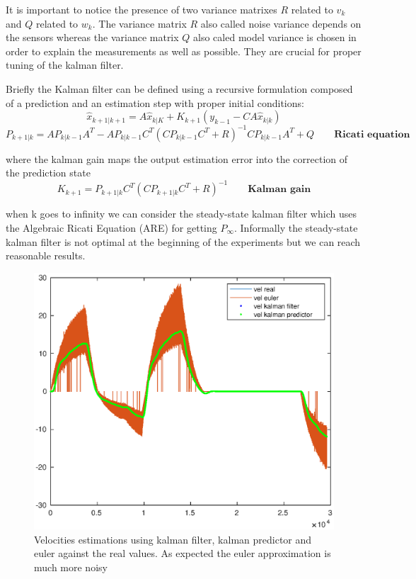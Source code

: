 \documentclass[a4paper,12pt]{article}
\begin{document}
It is important to notice the presence of two variance matrixes $R$ related to $v_k$ and $Q$ related to $w_k$. The variance matrix $R$ also called noise variance depends on the sensors whereas the variance
matrix $Q$ also caled model variance is chosen in order to explain the measurements as well as
possible. They are crucial for proper tuning of the kalman filter.

\bigskip
\noindent Briefly the Kalman filter can be defined using a recursive formulation composed of a prediction and an estimation step with proper initial conditions:
\[
    \hat{x}_{k+1|k+1} = A\hat{x}_{k|K} + K_{k+1}(y_{k-1} - CA\hat{x}_{k|k})
\]   
\[
    P_{k+1|k} = AP_{k|k-1}A^T - AP_{k|k-1}C^T(CP_{k|k-1}C^T + R)^{-1}CP_{k|k-1}A^T+Q \qquad \textbf{Ricati equation}
\]

\bigskip
where the kalman gain maps the output estimation error into the correction of the prediction state
\[
    K_{k+1} = P_{k+1|k}C^T(CP_{k+1|k}C^T+R)^{-1} \qquad \textbf{Kalman gain}
\]

when k goes to infinity we can consider the steady-state kalman filter which uses the Algebraic Ricati Equation (ARE) for getting $P_{\infty}$. Informally the steady-state kalman filter is not optimal at the beginning of the experiments but we can reach reasonable results.

\begin{figure}[H]
    \begin{center}
        \includegraphics[scale=0.7]{images/velocities.eps}
    \end{center}
    \caption{Velocities estimations using kalman filter, kalman predictor and euler against the real values. As expected the euler approximation is much more noisy}
    \label{fig:hw3_vel}
\end{figure}
\end{document}
